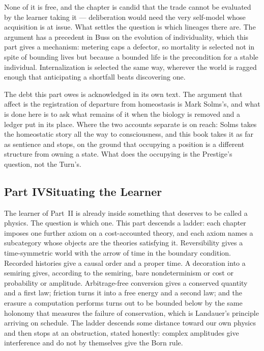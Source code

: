 \documentclass[12pt,openright,twoside]{book}
\theoremstyle{remark}
\theoremstyle{plain}
\theoremstyle{remark}
\theoremstyle{plain}
\theoremstyle{plain}
\begin{document}
None of it is free, and the chapter is candid that the trade cannot be
evaluated by the learner taking it --- deliberation would need the very
self-model whose acquisition is at issue.
What settles the question is which lineages there are.
The argument has a precedent in Buss on the evolution of individuality,
which this part gives a mechanism: metering caps a defector, so mortality
is selected not in spite of bounding lives but because a bounded life is
the precondition for a stable individual.
Internalization is selected the same way, wherever the world is ragged
enough that anticipating a shortfall beats discovering one.

The debt this part owes is acknowledged in its own text.
The argument that affect is the registration of departure from
homeostasis is Mark Solms's, and what is done here is to ask what remains
of it when the biology is removed and a ledger put in its place.
Where the two accounts separate is on reach: Solms takes the homeostatic
story all the way to consciousness, and this book takes it as far as
sentience and stops, on the ground that occupying a position is a
different structure from owning a state.
What does the occupying is the Prestige's question, not the Turn's.

\subsection*{Part IV\quad Situating the Learner}

The learner of Part~II is already inside something that deserves to be
called a physics.
The question is which one.
This part descends a ladder: each chapter imposes one further axiom on a
cost-accounted theory, and each axiom names a subcategory whose objects
are the theories satisfying it.
Reversibility gives a time-symmetric world with the arrow of time in the
boundary condition.
Recorded histories give a causal order and a proper time.
A decoration into a semiring gives, according to the semiring, bare
nondeterminism or cost or probability or amplitude.
Arbitrage-free conversion gives a conserved quantity and a first law;
friction turns it into a free energy and a second law; and the erasure a
computation performs turns out to be bounded below by the same holonomy
that measures the failure of conservation, which is Landauer's principle
arriving on schedule.
The ladder descends some distance toward our own physics and then stops
at an obstruction, stated honestly: complex amplitudes give interference
and do not by themselves give the Born rule.
\end{document}
